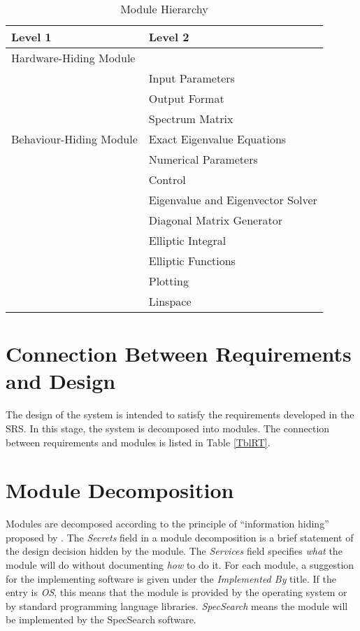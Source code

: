 \documentclass[12pt, titlepage]{article}
\newcommand{\progname}{SpecSearch}
\begin{document}
	\begin{table}[h]
		\centering
		\begin{tabular}{p{} p{}}
			\toprule
			\textbf{Level 1} & \textbf{Level 2}\\
			\midrule
			
			{Hardware-Hiding Module} & ~ \\
			\midrule
			
			\multirow{7}{0.3\textwidth}{Behaviour-Hiding Module} 
			& Input Parameters \\
			& Output Format \\
			& Spectrum Matrix \\
			& Exact Eigenvalue Equations \\
			& Numerical Parameters \\  
			& Control \\ 
			\midrule
			
			\multirow{3}{0.3\textwidth}{Software Decision Module} 
			& Eigenvalue and Eigenvector Solver \\
			& Diagonal Matrix Generator\\
			& Elliptic Integral\\ 
			& Elliptic Functions\\ 
			& Plotting \\ 
			& Linspace \\
			\bottomrule
			
		\end{tabular}
		\caption{Module Hierarchy}
		\label{TblMH}
	\end{table}
	
	\newpage 
	\section{Connection Between Requirements and Design} \label{SecConnection}
	
	The design of the system is intended to satisfy the requirements developed 
	in
	the SRS. In this stage, the system is decomposed into modules. The 
	connection
	between requirements and modules is listed in Table \ref{TblRT}.
	
	\section{Module Decomposition} \label{SecMD}
	
	
	Modules are decomposed according to the principle of ``information hiding''
	proposed by \citet{ParnasEtAl1984}. The \emph{Secrets} field in a module
	decomposition is a brief statement of the design decision hidden by the
	module. The \emph{Services} field specifies \emph{what} the module will do
	without documenting \emph{how} to do it. For each module, a suggestion for 
	the
	implementing software is given under the \emph{Implemented By} title. If the
	entry is \emph{OS}, this means that the module is provided by the operating
	system or by standard programming language libraries.  \emph{\progname{}} 
	means 
	the
	module will be implemented by the \progname{} software.
	
\end{document}
